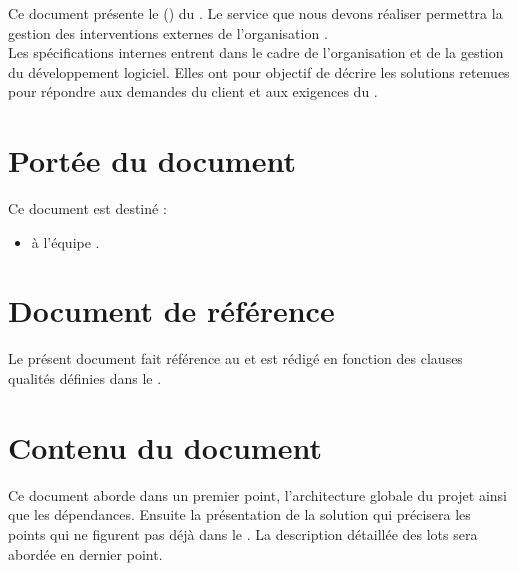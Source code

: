 Ce document présente le \DSI{} (\DSICourt) du \PIC{} \nomPIC. Le service que nous devons réaliser permettra la gestion des interventions externes de l'organisation \nomClient. \\

	Les spécifications internes entrent dans le cadre de l'organisation et de la gestion du développement logiciel. Elles ont pour objectif de décrire les solutions retenues pour répondre aux demandes du client et aux exigences du \DSECourt{}. 
	
\section*{Portée du document}
	Ce document est destiné :
	\begin{itemize}
		\item à l'équipe \PICCourt{} \nomEquipe.
	\end{itemize}
	
\section*{Document de référence}
	Le présent document fait référence au \DSE{} et est rédigé en fonction des clauses qualités définies dans le \PQ.
	
\section*{Contenu du document}
	Ce document aborde dans un premier point, l'architecture globale du projet ainsi que les dépendances. Ensuite la présentation de la solution qui précisera les points qui ne figurent pas déjà dans le \DSECourt{}. La description détaillée des lots sera abordée en dernier point.